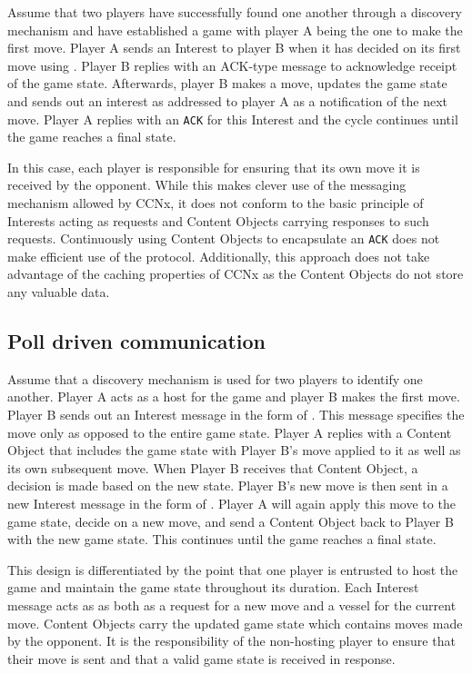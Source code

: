 \documentclass[a4paper,12pt]{report}      %
\begin{document}
Assume that two players have successfully found one another through a discovery mechanism and
have established a game with player A being the one to make the first move. Player A sends an Interest
to player B when it has decided on its first move using \texttt{}.
Player B replies with an ACK-type message to acknowledge receipt of the game state. Afterwards,
player B makes a move, updates the game state and sends out an interest as
\texttt{} addressed to player A as a notification of the next move.
Player A replies with an \verb!ACK! for this Interest and the cycle continues until the game reaches a final
state.

In this case, each player is responsible for ensuring that its own move it is received by the opponent. While this makes clever use of the messaging mechanism allowed by CCNx, it does not conform to the basic principle of Interests acting as requests and 
Content Objects carrying responses to such requests. Continuously using Content Objects to encapsulate an \verb!ACK! 
does not make efficient use of the protocol. Additionally, this approach does not take advantage of the caching properties of CCNx as the Content Objects do not store any valuable data.

\subsection{Poll driven communication}

Assume that a discovery mechanism is used for two players to identify one another. Player A acts as a
host for the game and player B makes the first move. Player B sends out an Interest message in the
form of \texttt{}. This message specifies the move only 
as opposed to the entire game state. Player A replies with a Content Object that includes the game state
with Player B's move applied to it as well as its own subsequent move. When Player B
receives that Content Object, a decision is made based on the new state. Player B's new move is then sent 
in a new Interest message in the form of \texttt{}. 
Player A will again apply this move to the game state, decide on a new move, and send a Content
Object back to Player B with the new game state. This continues until the game reaches a final state.

This design is differentiated by the point that one player is entrusted to host the game and maintain the
game state throughout its duration. Each Interest message acts as as both as a request for a new move
and a vessel for the current move. Content Objects carry the updated game state which contains moves
made by the opponent. It is the responsibility of the non-hosting player to ensure that their move is sent
and that a valid game state is received in response.
\end{document}
